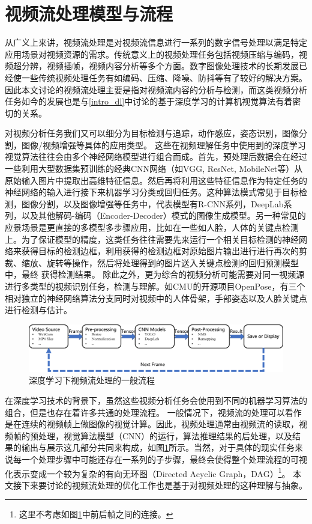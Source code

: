 \section{视频流处理模型与流程}\label{intro_vp}
从广义上来讲，视频流处理是对视频流信息进行一系列的数字信号处理以满足特定应用场景对视频资源的需求。传统意义上的视频处理任务包括视频压缩与编码，视频超分辨，视频插帧，视频内容分析等多个方面。数字图像处理技术的长期发展已经使一些传统视频处理任务有如编码、压缩、降噪、防抖等有了较好的解决方案。因此本文讨论的视频流处理主要是指对视频流内容的分析与检测，而这类视频分析任务如今的发展也是与\ref{intro_dl}中讨论的基于深度学习的计算机视觉算法有着密切的关系。\par
对视频分析任务我们又可以细分为目标检测与追踪，动作感应，姿态识别，图像分割，图像/视频增强等具体的应用类型。%
这些在视频理解任务中使用到的深度学习视觉算法往往会由多个神经网络模型进行组合而成。首先，预处理后数据会在经过一些利用大型数据集预训练的经典CNN网络（如VGG\cite{simonyan2014very}, ResNet\cite{he2016deep}, MobileNet\cite{howard2017mobilenets}等）从原始输入图片中提取出高维特征信息。然后再将利用这些特征信息作为特定任务的神经网络的输入进行接下来机器学习分类或回归任务。这种算法模式常见于目标检测，图像分割，以及图像增强等任务中，代表模型有R-CNN\cite{he2017mask}系列，DeepLab\cite{chen2017deeplab}系列，以及其他解码-编码（Encoder-Decoder）模式的图像生成模型。另一种常见的应景场景是更直接的多模型多步骤应用，比如在一些如人脸，人体的关键点检测上。为了保证模型的精度，这类任务往往需要先来运行一个相关目标检测的神经网络来获得目标的检测边框，利用获得的检测边框对原始图片输出进行进行再次的剪裁、缩放、旋转等操作，然后将处理得到的图片送入关键点检测的回归预测模型中，最终
获得检测结果\cite{fang2017rmpe,zhang2016joint}。%
除此之外，更为综合的视频分析可能需要对同一视频源进行多类型的视频识别任务，检测与理解。如CMU的开源项目OpenPose\cite{cao2018openpose}，有三个相对独立的神经网络算法分支同时对视频中的人体骨架，手部姿态以及人脸关键点进行检测与估计。\par
\begin{figure}[!htp]
    \centering
    \includegraphics[width=\textwidth]{figure/video_proc_flow.pdf}
    \caption{深度学习下视频流处理的一般流程}
    \label{fig:video_proc_flow}
\end{figure}
在深度学习技术的背景下，虽然这些视频分析任务会使用到不同的机器学习算法的组合，但是也存在着许多共通的处理流程。%
一般情况下，视频流的处理可以看作是在连续的视频帧上做图像的视觉计算。因此，视频处理通常由视频流的读取，视频帧的预处理，视觉算法模型（CNN）的运行，算法推理结果的后处理，以及结果的输出与展示这几部分共同来构成，如图\ref{fig:video_proc_flow}所示。当然，对于具体的现实任务来说每一个处理步骤中可能还存在一系列的子步骤，最终会使得整个处理流程的可视化表示变成一个较为复杂的有向无环图（Directed Acyclic Graph，DAG）\footnote{这里不考虑如图\ref{fig:video_proc_flow}中前后帧之间的连接。}。 本文接下来要讨论的视频流处理的优化工作也是基于对视频处理的这种理解与抽象。\par

